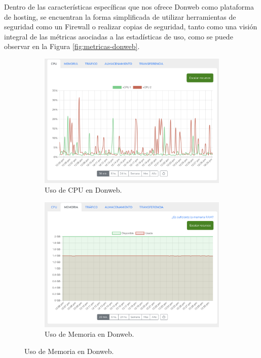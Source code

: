 {Dentro de las características específicas que nos ofrece Donweb como plataforma de hosting, se encuentran la forma simplificada de utilizar herramientas de seguridad como un Firewall o realizar copias de seguridad, tanto como una visión integral de las métricas asociadas a las estadísticas de uso, como se puede observar en la Figura \ref{fig:metricas-donweb}.

\begin{figure}[H]
    \centering
    \begin{subfigure}[b]{0.45\textwidth}
        \centering
        \includegraphics[width=\textwidth]{Figures/PortalWeb/CPU-Donweb.png}
        \caption{Uso de CPU en Donweb.}
        \label{fig:cpu-donweb}
    \end{subfigure}
    \hfill
    \begin{subfigure}[b]{0.45\textwidth}
        \centering
        \includegraphics[width=\textwidth]{Figures/PortalWeb/Memoria-Donweb.png}
        \caption{Uso de Memoria en Donweb.}
        \label{fig:memoria-donweb}
    \end{subfigure}
    

\end{figure}}
